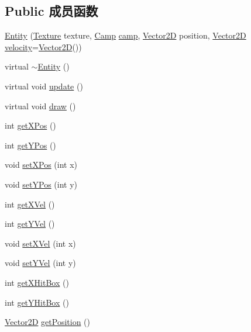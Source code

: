 \subsection*{Public 成员函数}
\begin{DoxyCompactItemize}
\item 
\hyperlink{class_entity_a604327e36e9783d29dd6ae6e4626777a}{Entity} (\hyperlink{struct_texture}{Texture} texture, \hyperlink{_entity_8h_ad54c4fe39f1c51b786c24ae0b7763b44}{Camp} \hyperlink{class_entity_a5326accd49d3817310ec90692b9da3df}{camp}, \hyperlink{_vector2_d_8hpp_aa1f1145650f1dd9bddf7335ec6434d7c}{Vector2D} position, \hyperlink{_vector2_d_8hpp_aa1f1145650f1dd9bddf7335ec6434d7c}{Vector2D} \hyperlink{class_entity_a386d25b56772b8913eb3e5adc636f6e0}{velocity}=\hyperlink{_vector2_d_8hpp_aa1f1145650f1dd9bddf7335ec6434d7c}{Vector2D}())
\item 
virtual \hyperlink{class_entity_a588098978eea6a3486b7361605ff3f0f}{$\sim$\+Entity} ()
\item 
virtual void \hyperlink{class_entity_a00b6eeaf99b35c8f8b10b5fbfc1baf4f}{update} ()
\item 
virtual void \hyperlink{class_entity_a7666f416dd0d1fce0f1133f78df44476}{draw} ()
\item 
int \hyperlink{class_entity_a0be9d16acca47749b5450954b7cd8865}{get\+X\+Pos} ()
\item 
int \hyperlink{class_entity_a84360a6824c2e29fa324eb9cc0d988e0}{get\+Y\+Pos} ()
\item 
void \hyperlink{class_entity_a8afb8aa252cbbffecc2dff0669cb2896}{set\+X\+Pos} (int x)
\item 
void \hyperlink{class_entity_a66278a362d97e2a30912c2a31962bfb9}{set\+Y\+Pos} (int y)
\item 
int \hyperlink{class_entity_af10fa675180cfc3c61bf84a9c9c56b3c}{get\+X\+Vel} ()
\item 
int \hyperlink{class_entity_a56464fa481c71c541c51700c5498c6b0}{get\+Y\+Vel} ()
\item 
void \hyperlink{class_entity_a7f20a2190046121150e5903ec769e9dc}{set\+X\+Vel} (int x)
\item 
void \hyperlink{class_entity_a9d7c4a35217e6f83ac21da314aa3ec9a}{set\+Y\+Vel} (int y)
\item 
int \hyperlink{class_entity_a82c547dbbfc7d0f353f3af2d04e17723}{get\+X\+Hit\+Box} ()
\item 
int \hyperlink{class_entity_a843b664cfecb1a912f3bc385f6ef2ae2}{get\+Y\+Hit\+Box} ()
\item 
\hyperlink{_vector2_d_8hpp_aa1f1145650f1dd9bddf7335ec6434d7c}{Vector2D} \hyperlink{class_entity_a76d40195158d4ac1353834b6c95aba21}{get\+Position} ()

\end{DoxyCompactItemize}
